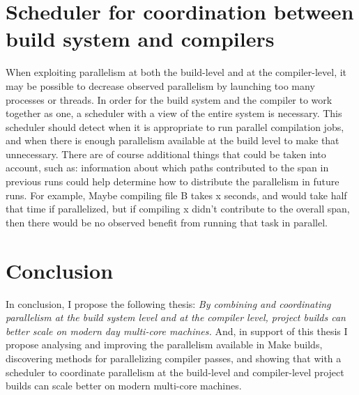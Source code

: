 \documentclass[10pt]{article}
\begin{document}

\section{Scheduler for coordination between build system and compilers}

When exploiting parallelism at both the build-level and at the compiler-level, it may be possible to
decrease observed parallelism by launching too many processes or threads.  In order for the build
system and the compiler to work together as one, a scheduler with a view of the entire system
is necessary.  This scheduler should detect when it is appropriate to run parallel compilation
jobs, and when there is enough parallelism available at the build level to make that unnecessary.
There are of course additional things that could be taken into account, such as: information about which
paths contributed to the span in previous runs could help determine how
to distribute the parallelism in future runs.
For example, Maybe compiling file B takes x
seconds, and would take half that time if parallelized, but if compiling x didn't contribute to
the overall span, then there would be no observed benefit from running that task in parallel.

\section{Conclusion}

In conclusion, I propose the following thesis: \emph{By combining and coordinating parallelism at the build system level
and at the compiler level, project builds can better scale on modern day multi-core
machines.}  And, in support of this thesis I propose analysing and improving the parallelism available in Make builds,
discovering methods for parallelizing compiler passes, and showing that with a scheduler to coordinate parallelism at
the build-level and compiler-level project builds can scale better on modern multi-core machines.

\newpage


\end{document}
